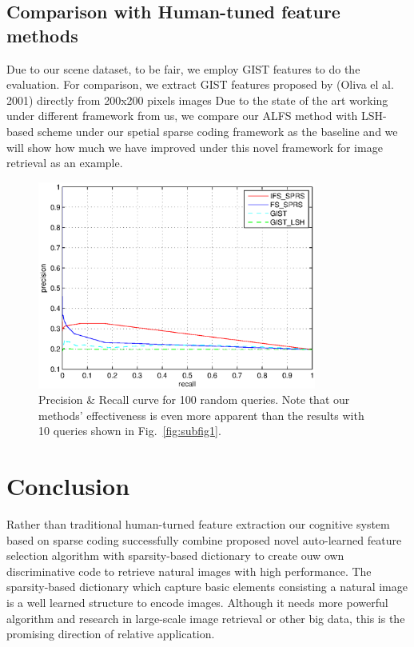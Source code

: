 \documentclass[letterpaper]{article}
\begin{document}
\subsection{Comparison with Human-tuned feature methods}
Due to our scene dataset, to be fair, we employ GIST features to do the evaluation. For comparison, we extract GIST features proposed by (Oliva el al. 2001) directly from 200x200 pixels images 
Due to the state of the art working under different framework from us,  we compare our ALFS method with LSH-based scheme under our spetial sparse coding framework as the baseline and we will show how much we have improved under this novel framework for image retrieval as an example. 


\begin{figure}[ht]
	\centering
	\includegraphics[width=3.6in]{figures_dir/round4_random100_4comparison_75.eps}
	\caption{Precision \& Recall curve for 100 random queries. Note that our methods' effectiveness is even more apparent than the results with 10 queries shown in Fig.~\ref{fig:subfig1}.}
	\label{random 100 queries}
	
\end{figure}

\section{Conclusion}
Rather than traditional human-turned feature extraction our cognitive system based on sparse coding successfully combine proposed novel auto-learned feature selection algorithm with sparsity-based dictionary to create ouw own discriminative code to retrieve natural images with high performance. The sparsity-based dictionary which capture basic elements consisting a natural image is a well learned structure to encode images. Although it needs more powerful algorithm and research in large-scale image retrieval or other big data, this is the promising direction of relative application.  
\end{document}
